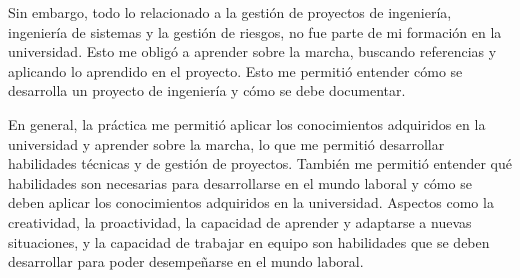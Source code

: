 Sin embargo, todo lo relacionado a la gestión de proyectos de ingeniería, ingeniería de sistemas y la gestión de riesgos, no fue parte de mi formación en la universidad. Esto me obligó a aprender sobre la marcha, buscando referencias y aplicando lo aprendido en el proyecto. Esto me permitió entender cómo se desarrolla un proyecto de ingeniería y cómo se debe documentar.

En general, la práctica me permitió aplicar los conocimientos adquiridos en la universidad y aprender sobre la marcha, lo que me permitió desarrollar habilidades técnicas y de gestión de proyectos. También me permitió entender qué habilidades son necesarias para desarrollarse en el mundo laboral y cómo se deben aplicar los conocimientos adquiridos en la universidad. Aspectos como la creatividad, la proactividad, la capacidad de aprender y adaptarse a nuevas situaciones, y la capacidad de trabajar en equipo son habilidades que se deben desarrollar para poder desempeñarse en el mundo laboral.

\newpage


